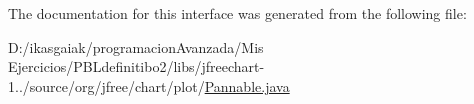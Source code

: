The documentation for this interface was generated from the following file\+:\begin{DoxyCompactItemize}
\item 
D\+:/ikasgaiak/programacion\+Avanzada/\+Mis Ejercicios/\+P\+B\+Ldefinitibo2/libs/jfreechart-\/1../source/org/jfree/chart/plot/\mbox{\hyperlink{_pannable_8java}{Pannable.\+java}}\end{DoxyCompactItemize}
